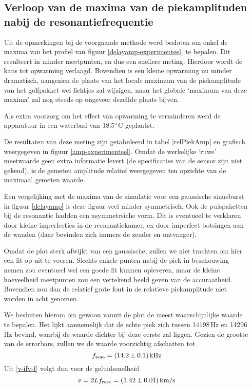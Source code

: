 \subsection{Verloop van de maxima van de piekamplituden nabij de 
resonantiefrequentie}
Uit de opmerkingen bij de voorgaande methode werd besloten om enkel de 
maxima van het profiel van figuur \ref{delayamp-experimenteel} te bepalen.  
Dit resulteert in minder meetpunten, en dus een snellere meting. Hierdoor 
wordt de kans tot opwarming verlaagd. Bovendien is een kleine opwarming nu 
minder dramatisch, aangezien de plaats van het locale maximum van de 
piekamplitude van het golfpakket wel lichtjes zal wijzigen, maar het 
globale `maximum van deze maxima' zal nog steeds op ongeveer dezelfde 
plaats bijven.

Als extra voorzorg om het effect van opwarming te verminderen werd de 
apparatuur in een waterbad van $18.5^\circ$C geplaatst.

De resultaten van deze meting zijn getabuleerd in tabel \ref{relPiekAmp} en 
grafisch weergegeven in figuur \ref{amp-experimenteel}. Omdat de werkelijke 
`ruwe' meetwaarde geen extra informatie levert (de specificaties van de 
sensor zijn niet gekend), is de gemeten amplitude relatief weergegeven ten 
opzichte van de maximaal gemeten waarde.

\relPiekAmp
{}

Een vergelijking met de maxima van de simulatie voor een gaussische 
sinusburst in figuur \ref{delayamp} is deze figuur veel minder symmetrisch.  
Ook de pulspaketten bij de resonantie hadden een asymmetrsiche vorm. Dit is 
eventueel te verklaren door kleine imperfecties in de resonantiekamer, en 
door imperfect botsingen aan de wanden (daar bevinden zich immers de zender 
en ontvanger).

Omdat de plot sterk afwijkt van een gaussische, zullen we niet trachten om 
hier een fit op uit te voeren. Slechts enkele punten nabij de piek in 
beschouwing nemen zou eventueel wel een goede fit kunnen opleveren, maar de 
kleine hoeveelheid meetpunten zou een vertekend beeld geven van de 
accuraatheid. Bovendien zou dan de relatief grote fout in de relatieve 
piekamplitude niet worden in acht genomen.

We besluiten hierom om gewoon vanuit de plot de meest waarschijnlijke 
waarde te bepalen. Het lijkt aannemelijk dat de echte piek zich tussen
14198\,Hz en 14296\,Hz bevind, waarbij de waarde dichter bij deze eerste 
zal liggen. Gezien de grootte van de errorbars, zullen we de waarde 
voorzichtig afschatten tot
$$
f_\mathrm{reso} = (14.2 \pm 0.1)\,\rm kHz
$$
Uit \ref{v-ifv-f} volgt dan voor de geluidssnelheid
$$
v = 2Lf_\mathrm{reso}
= (1.42 \pm 0.01)\,\rm km/s
$$

